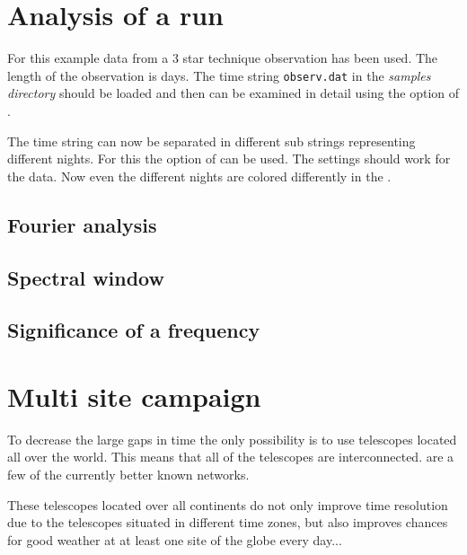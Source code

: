 
\section{Analysis of a run}
For this example data from a 3 star technique observation has been used.
The length of the observation is \toedit days.
The time string {\tt observ.dat} in the {\it samples directory}
should be loaded and then can be examined
in detail using the  option of \period.

The time string can now be separated in different sub strings representing different nights.
For this the  option of \period can be used.
The settings should work for the data. Now even the different nights are colored differently
in the .

\subsection{Fourier analysis}
\subsection{Spectral window}
\subsection{Significance of a frequency}


\section{Multi site campaign}
To decrease the large gaps in time the only possibility is to use
telescopes located all over the world. This means that all of the
telescopes are interconnected.
are a few of the currently better known networks.

These telescopes located over all continents do not only
improve time resolution due to the telescopes situated in
different time zones, but also improves chances for good weather at
at least one site of the globe every day...

